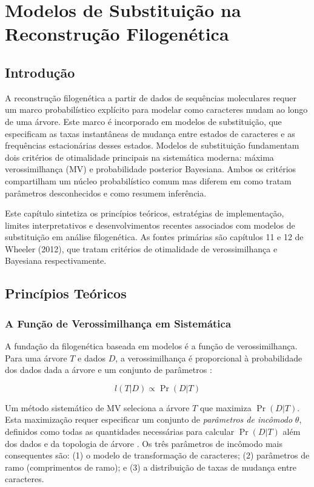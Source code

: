 
\chapter{Modelos de Substituição na Reconstrução Filogenética}

\section{Introdução}

A reconstrução filogenética a partir de dados de sequências moleculares requer um marco probabilístico explícito para modelar como caracteres mudam ao longo de uma árvore. Este marco é incorporado em modelos de substituição, que especificam as taxas instantâneas de mudança entre estados de caracteres e as frequências estacionárias desses estados. Modelos de substituição fundamentam dois critérios de otimalidade principais na sistemática moderna: máxima verossimilhança (MV) e probabilidade posterior Bayesiana. Ambos os critérios compartilham um núcleo probabilístico comum mas diferem em como tratam parâmetros desconhecidos e como resumem inferência.

Este capítulo sintetiza os princípios teóricos, estratégias de implementação, limites interpretativos e desenvolvimentos recentes associados com modelos de substituição em análise filogenética. As fontes primárias são capítulos 11 e 12 de Wheeler (2012), que tratam critérios de otimalidade de verossimilhança e Bayesiana respectivamente.

\section{Princípios Teóricos}

\subsection{A Função de Verossimilhança em Sistemática}

A fundação da filogenética baseada em modelos é a função de verossimilhança. Para uma árvore $T$ e dados $D$, a verossimilhança é proporcional à probabilidade dos dados dada a árvore e um conjunto de parâmetros \parencite{edwards1972}:

$$l(T|D) \propto \Pr(D|T)$$

Um método sistemático de MV seleciona a árvore $T$ que maximiza $\Pr(D|T)$. Esta maximização requer especificar um conjunto de \textit{parâmetros de incômodo} $\theta$, definidos como todas as quantidades necessárias para calcular $\Pr(D|T)$ além dos dados e da topologia de árvore \parencite{wheeler2012}. Os três parâmetros de incômodo mais consequentes são: (1) o modelo de transformação de caracteres; (2) parâmetros de ramo (comprimentos de ramo); e (3) a distribuição de taxas de mudança entre caracteres.

